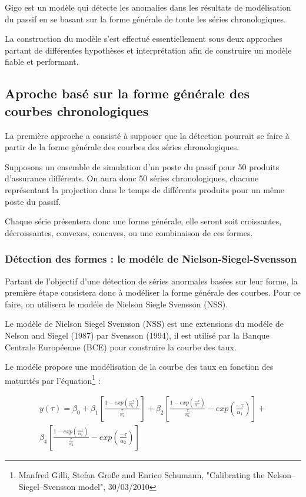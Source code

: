 Gigo est un modèle qui détecte les anomalies dans les résultats de modélisation du passif en se basant sur la forme générale de toute les séries chronologiques.

La construction du modèle s'est effectué essentiellement sous deux approches partant de différentes hypothèses et interprétation afin de construire un modèle fiable et performant. 

\subsection{Aproche basé sur la forme générale des courbes chronologiques}

La première approche a consisté à supposer que la détection pourrait se faire à partir de la forme générale des courbes des séries chronologiques. 

Supposons un ensemble de simulation d'un poste du passif pour 50 produits d'assurance différents. On aura donc 50 séries chronologiques, chacune représentant la projection dans le temps de différents produits pour un même poste du passif.

Chaque série présentera donc une forme générale, elle seront soit croissantes, décroissantes, convexes, concaves, ou une combinaison de ces formes.

\subsubsection{Détection des formes : le modéle de Nielson-Siegel-Svensson}

Partant de l'objectif d'une détection de séries anormales basées sur leur forme, la première étape consistera donc à modéliser la forme générale des courbes. Pour ce faire, on utilisera le modéle de Nielson Siegle Svensson (NSS).

Le modèle de Nielson Siegel Svensson (NSS) est une extensions du modéle de Nelson and Siegel (1987) par Svensson (1994), il est utilisé par la Banque Centrale Européenne (BCE) pour construire la courbe des taux. 

Le modéle propose une modélisation de la courbe des taux en fonction des maturités par l'équation\footnote{Manfred Gilli, Stefan Große and Enrico Schumann, "Calibrating the Nelson–Siegel–Svensson model", 30/03/2010} :

\begin{multline}
y(\tau)=\beta_{0}+\beta_{1}\left[\frac{1-exp(\frac{-\tau}{\alpha_{1}})}{\frac{\tau}{\alpha_{1}}}\right]+\beta_{2}\left[\frac{1-exp(\frac{-\tau}{\alpha_{1}})}{\frac{\tau}{\alpha_{1}}}-exp(\frac{-\tau}{\alpha_{1}})\right]+ \\
\beta_{4}\left[\frac{1-exp(\frac{-\tau}{\alpha_{2}})}{\frac{\tau}{\alpha_{2}}}-exp(\frac{-\tau}{\alpha_{2}})\right]
\label{nss}
\end{multline}

